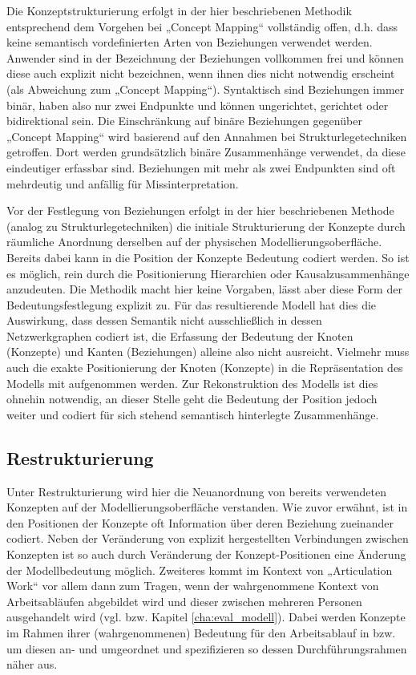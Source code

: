 Die Konzeptstrukturierung erfolgt in der hier beschriebenen Methodik entsprechend dem Vorgehen bei „Concept Mapping“ vollständig offen, d.h. dass keine semantisch vordefinierten Arten von Beziehungen verwendet werden. Anwender sind in der Bezeichnung der Beziehungen vollkommen frei und können diese auch explizit nicht bezeichnen, wenn ihnen dies nicht notwendig erscheint (als Abweichung zum „Concept Mapping“). Syntaktisch sind Beziehungen immer binär, haben also nur zwei Endpunkte und können ungerichtet, gerichtet oder bidirektional sein. Die Einschränkung auf binäre Beziehungen gegenüber „Concept Mapping“ wird basierend auf den Annahmen bei Strukturlegetechniken getroffen. Dort werden grundsätzlich binäre Zusammenhänge verwendet, da diese eindeutiger erfassbar sind. Beziehungen mit mehr als zwei Endpunkten sind oft mehrdeutig und anfällig für Missinterpretation.

Vor der Festlegung von Beziehungen erfolgt in der hier beschriebenen Methode (analog zu Strukturlegetechniken) die initiale Strukturierung der Konzepte durch räumliche Anordnung derselben auf der physischen Modellierungsoberfläche. Bereits dabei kann in die Position der Konzepte Bedeutung codiert werden. So ist es möglich, rein durch die Positionierung Hierarchien oder Kausalzusammenhänge anzudeuten. Die Methodik macht hier keine Vorgaben, lässt aber diese Form der Bedeutungsfestlegung explizit zu. Für das resultierende Modell hat dies die Auswirkung, dass dessen Semantik nicht ausschließlich in dessen Netzwerkgraphen codiert ist, die Erfassung der Bedeutung der Knoten (Konzepte) und Kanten (Beziehungen) alleine also nicht ausreicht. Vielmehr muss auch die exakte Positionierung der Knoten (Konzepte) in die Repräsentation des Modells mit aufgenommen werden. Zur Rekonstruktion des Modells ist dies ohnehin notwendig, an dieser Stelle geht die Bedeutung der Position jedoch weiter und codiert für sich stehend semantisch hinterlegte Zusammenhänge. 

\subsection{Restrukturierung}

Unter Restrukturierung wird hier die Neuanordnung von bereits verwendeten Konzepten auf der Modellierungsoberfläche verstanden. Wie zuvor erwähnt, ist in den Positionen der Konzepte oft Information über deren Beziehung zueinander codiert. Neben der Veränderung von explizit hergestellten Verbindungen zwischen Konzepten ist so auch durch Veränderung der Konzept-Positionen eine Änderung der Modellbedeutung möglich. Zweiteres kommt im Kontext von „Articulation Work“ vor allem dann zum Tragen, wenn der wahrgenommene Kontext von Arbeitsabläufen abgebildet wird und dieser zwischen mehreren Personen ausgehandelt wird (vgl. \citep{Wahlmuller10} bzw. Kapitel \ref{cha:eval_modell}). Dabei werden Konzepte im Rahmen ihrer (wahrgenommenen) Bedeutung für den Arbeitsablauf in bzw. um diesen an- und umgeordnet und spezifizieren so dessen Durchführungsrahmen näher aus. 

